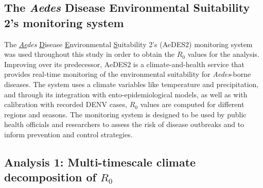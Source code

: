 \documentclass[10pt,twocolumn]{wlscirep}
\begin{document}
\subsection{The \textit{Aedes} Disease Environmental Suitability 2's monitoring system} \label{sec-methods-aedes2}

The \textit{\underline{Ae}des} \underline{D}isease \underline{E}nvironmental \underline{S}uitability 2's (AeDES2) monitoring system\cite{guerra_2025} was used throughout this study in order to obtain the $R_0$ values for the analysis. Improving over its predecessor\cite{munoz_2020b}, AeDES2 is a climate-and-health service that provides real-time monitoring of the environmental suitability for \textit{Aedes}-borne diseases. The system uses a climate variables like temperature and precipitation, and through its integration with ento-epidemiological models, as well as with calibration with recorded DENV cases, $R_0$ values are computed for different regions and seasons. The monitoring system is designed to be used by public health officials and researchers to assess the risk of disease outbreaks and to inform prevention and control strategies.

\subsection{Analysis 1: Multi-timescale climate decomposition of $R_0$} \label{sec-methods-1-analysis}
\end{document}

